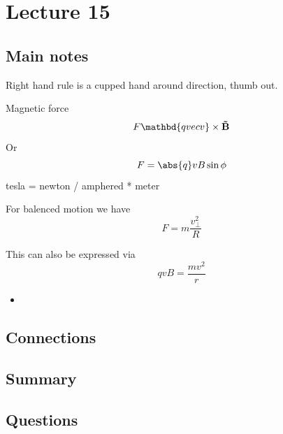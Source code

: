 \section{Lecture 15}

\subsection{Main notes}

Right hand rule is a cupped hand around direction, thumb out.

Magnetic force
\[
F \mathbd{q vec{v}} \times \mathbf{\vec{B}}
  \]
  Or
\[
F = \abs{q}vB \sin{\phi}
  \]
  tesla = newton / amphered * meter

  For balenced motion we have
\[
F = m \frac{v^2_\bot}{R}
  \]

  This can also be expressed via
\[
qvB = \frac{mv^2}{r} \]
\begin{itemize}
	\item
\end{itemize}


\subsection{Connections}


\subsection{Summary}


\subsection{Questions}
